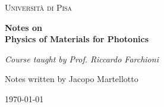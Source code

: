 \documentclass[11pt,a4paper]{book}
\begin{document}
\begin{titlepage}
    \centering
    \vspace*{2cm}
    
    {\scshape\LARGE Università di Pisa \par}
    \vspace{1.5cm}
    {\Huge\bfseries Notes on \\[0.5cm]
    Physics of Materials for Photonics\par}
    \vspace{2cm}
    {\Large\itshape Course taught by Prof. Riccardo Farchioni\par}
    \vfill
    {\large Notes written by Jacopo Martellotto\par}
    \vspace{0.5cm}
    {\large \today\par}
\end{titlepage}
\tableofcontents
\newpage









\cleardoublepage
{}
{}


\end{document}
